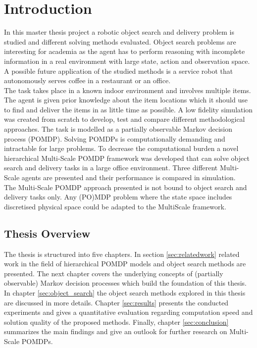 \chapter{Introduction}
\label{sec:introduction}

In this master thesis project a robotic object search and delivery problem is studied and different solving methods evaluated. Object search problems are interesting for academia as the agent has to perform reasoning with incomplete information in a real environment with large state, action and observation space. A possible future application of the studied methods is a service robot that autonomously serves coffee in a restaurant or an office.  \\

The task takes place in a known indoor environment and involves multiple items. The agent is given prior knowledge about the item locations which it should use to find and deliver the items in as little time as possible. A low fidelity simulation was created from scratch to develop, test and compare different methodological approaches. The task is modelled as a partially observable Markov decision process (POMDP). Solving POMDPs is computationally demanding and intractable for large problems. To decrease the computational burden a novel hierarchical Multi-Scale POMDP framework was developed that can solve object search and delivery tasks in a large office environment. Three different Multi-Scale agents are presented and their performance is compared in simulation.\\

The Multi-Scale POMDP approach presented is not bound to object search and delivery tasks only. Any (PO)MDP problem where the state space includes discretised physical space could be adapted to the MultiScale framework. 



\section{Thesis Overview}
The thesis is structured into five chapters. In section \ref{sec:relatedwork} related work in the field of hierarchical POMDP models and object search methods are presented. The next chapter covers the underlying concepts of (partially observable) Markov decision processes which build the foundation of this thesis. In chapter \ref{sec:object_search} the object search methods explored in this thesis are discussed in more details. Chapter \ref{sec:results} presents the conducted experiments and gives a quantitative evaluation regarding computation speed and solution quality of the proposed methods. Finally, chapter \ref{sec:conclusion} summarizes the main findings and give an outlook for further research on Multi-Scale POMDPs. 


